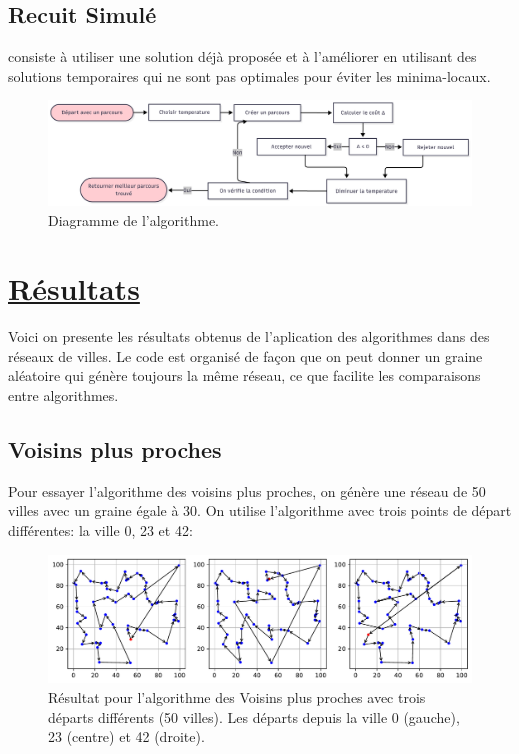 \documentclass[a4paper,11pt,fleqn]{article}
\begin{document}
\subsection*{Recuit Simulé}
consiste à utiliser une solution déjà proposée et à l’améliorer en utilisant des solutions temporaires qui ne sont pas optimales pour éviter les minima-locaux. 

\begin{figure}[H]
    \centering
    \includegraphics[width=\textwidth]{images/charte-recuit.png}
    \caption{Diagramme de l'algorithme.}
    \label{fig:charte-recuit}
\end{figure}

\section*{\underline{Résultats}}
Voici on presente les résultats obtenus de l'aplication des algorithmes dans des réseaux de villes. Le code est organisé de façon que on peut donner un graine aléatoire qui génère toujours la même réseau, ce que facilite les comparaisons entre algorithmes.

\subsection*{Voisins plus proches}
Pour essayer l'algorithme des voisins plus proches, on génère une réseau de 50 villes avec un graine égale à 30. On utilise l'algorithme avec trois points de départ différentes: la ville 0, 23 et 42:
\begin{figure}[H]
    \centering
    \includegraphics[width=\textwidth]{images/NN_50_villes_3departs.pdf}
    \caption{Résultat pour l'algorithme des Voisins plus proches avec trois départs différents (50 villes). Les départs depuis la ville 0 (gauche), 23 (centre) et 42 (droite).}
    \label{fig:nn-50}
\end{figure}
\end{document}
